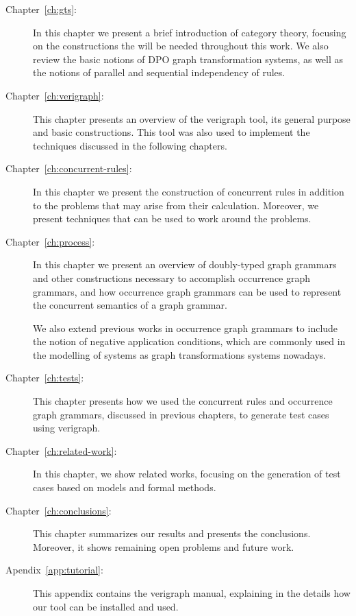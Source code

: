 \begin{description}
  \item[Chapter~\ref{ch:gts}:] In this chapter we present a brief introduction of category theory, focusing on the constructions the will be needed throughout this work.  We also review the basic notions of DPO graph transformation systems, as well as the notions of parallel and sequential independency of rules.
  \item[Chapter~\ref{ch:verigraph}:] This chapter presents an overview of the verigraph tool, its general purpose and basic constructions. This tool was also used to implement the techniques discussed in the following chapters.
  \item[Chapter~\ref{ch:concurrent-rules}:] In this chapter we present the construction of concurrent rules in addition to the problems that may arise from their calculation. Moreover, we present techniques that can be used to work around the problems.
  \item[Chapter~\ref{ch:process}:] In this chapter we present an overview of doubly-typed graph grammars and other constructions necessary to accomplish occurrence graph grammars, and how occurrence graph grammars can be used to represent the concurrent semantics of a graph grammar.

    We also extend previous works in occurrence graph grammars to include the notion of negative application conditions, which are commonly used in the modelling of systems as graph transformations systems nowadays.
  \item[Chapter~\ref{ch:tests}:] This chapter presents how we used the concurrent rules and occurrence graph grammars, discussed in previous chapters, to generate test cases using verigraph.
  \item[Chapter~\ref{ch:related-work}:] In this chapter, we show related works, focusing on the generation of test cases based on models and formal methods.
  \item[Chapter~\ref{ch:conclusions}:] This chapter summarizes our results and presents the conclusions. Moreover, it shows remaining open problems and future work.
  \item[Apendix~\ref{app:tutorial}:] This appendix contains the verigraph manual, explaining in the details how our tool can be installed and used.
\end{description}
